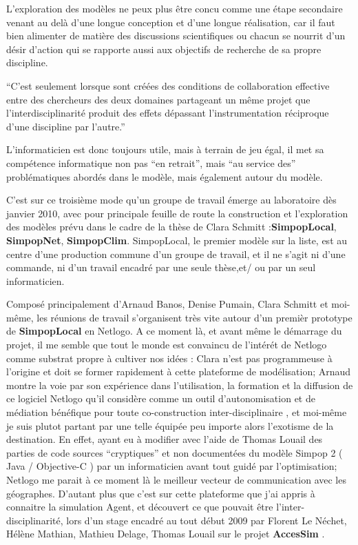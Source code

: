 L'exploration des modèles ne peux plus être concu comme une étape secondaire venant au delà d'une longue conception et d'une longue réalisation, car il faut bien alimenter de matière des discussions scientifiques ou chacun se nourrit d'un désir d'action qui se rapporte aussi aux objectifs de recherche de sa propre discipline. 

\enquote{C’est seulement lorsque sont créées des conditions de collaboration effective entre des chercheurs des deux domaines partageant un même projet que l’interdisciplinarité produit des effets dépassant l’instrumentation réciproque d’une discipline par l’autre.} \autocite{Pumain2014}

L'informaticien est donc toujours utile, mais à terrain de jeu égal, il met sa compétence informatique non pas \enquote{en retrait}, mais \enquote{au service des} problématiques abordés dans le modèle, mais également autour du modèle. 




C'est sur ce troisième mode qu'un groupe de travail émerge au laboratoire dès janvier 2010, avec pour principale feuille de route la construction et l'exploration des modèles prévu dans le cadre de la thèse de Clara Schmitt :\textbf{SimpopLocal}, \textbf{SimpopNet}, \textbf{SimpopClim}. SimpopLocal, le premier modèle sur la liste, est au centre d'une production commune d'un groupe de travail, et il ne s'agit ni d'une commande, ni d'un travail encadré par une seule thèse,et/ ou par un seul informaticien.

Composé principalement d'Arnaud Banos, Denise Pumain, Clara Schmitt et moi-même, les réunions de travail s'organisent très vite autour d'un premièr prototype de \textbf{SimpopLocal} en Netlogo. A ce moment là, et avant même le démarrage du projet, il me semble que tout le monde est convaincu de l'intérét de Netlogo comme substrat propre à cultiver nos idées : Clara n'est pas programmeuse à l'origine et doit se former rapidement à cette plateforme de modélisation; Arnaud montre la voie par son expérience dans l'utilisation, la formation et la diffusion de ce logiciel Netlogo qu'il considère comme un outil d'autonomisation et de médiation bénéfique pour toute co-construction inter-disciplinaire \autocite{Banos2013}, et moi-même je suis plutot partant par une telle équipée peu importe alors l'exotisme de la destination. En effet, ayant eu à modifier avec l'aide de Thomas Louail des parties de code sources \enquote{cryptiques} et non documentées du modèle Simpop 2 ( Java / Objective-C )  par un informaticien avant tout guidé par l'optimisation; Netlogo me parait à ce moment là le meilleur vecteur de communication avec les géographes. D'autant plus que c'est sur cette plateforme que j'ai appris à connaitre la simulation Agent, et découvert ce que pouvait être l'inter-disciplinarité, lors d'un stage encadré au tout début 2009 par Florent Le Néchet, Hélène Mathian, Mathieu Delage, Thomas Louail sur le projet \textbf{AccesSim} \autocite{Delage2010}.

